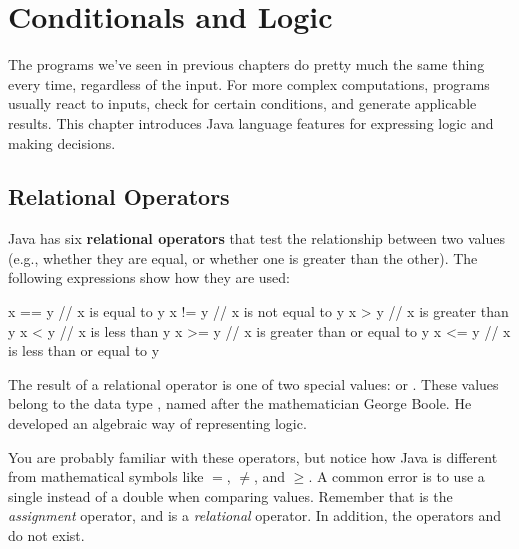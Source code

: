 \chapter{Conditionals and Logic}


The programs we've seen in previous chapters do pretty much the same thing every time, regardless of the input.
For more complex computations, programs usually react to inputs, check for certain conditions, and generate applicable results.
This chapter introduces Java language features for expressing logic and making decisions.


\section{Relational Operators}


Java has six {\bf relational operators} that test the relationship between two values (e.g., whether they are equal, or whether one is greater than the other).
The following expressions show how they are used:

\begin{code}
x == y          // x is equal to y
x != y          // x is not equal to y
x > y           // x is greater than y
x < y           // x is less than y
x >= y          // x is greater than or equal to y
x <= y          // x is less than or equal to y
\end{code}


The result of a relational operator is one of two special values:  or .
These values belong to the data type , named after the mathematician George Boole.
He developed an algebraic way of representing logic.


You are probably familiar with these operators, but notice how Java is different from mathematical symbols like $=$, $\neq$, and $\geq$.
A common error is to use a single \java{=} instead of a double \java{==} when comparing values.
Remember that \java{=} is the {\em assignment} operator, and \java{==} is a {\em relational} operator.
In addition, the operators \java{=<} and \java{=>} do not exist.


